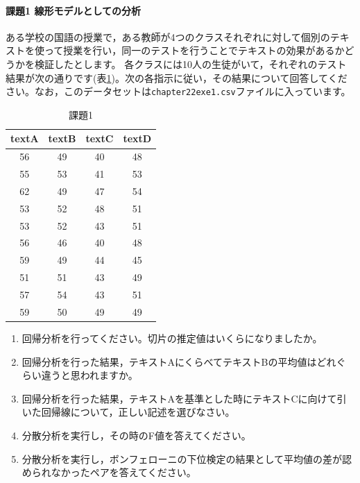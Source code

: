 \documentclass{ltjbook}
\begin{document}
\paragraph{課題1 線形モデルとしての分析}
ある学校の国語の授業で，ある教師が4つのクラスそれぞれに対して個別のテキストを使って授業を行い，同一のテストを行うことでテキストの効果があるかどうかを検証したとします。
各クラスには10人の生徒がいて，それぞれのテスト結果が次の通りです(表\ref{L23::exe1})。次の各指示に従い，その結果について回答してください。なお，このデータセットは\texttt{chapter22exe1.csv}ファイルに入っています。
\begin{table}[ht]
	\centering

	\caption{課題1}
	\begin{tabular}{cccc}
		\hline
		textA & textB & textC & textD \\
		\hline
		56    & 49    & 40    & 48    \\
		55    & 53    & 41    & 53    \\
		62    & 49    & 47    & 54    \\
		53    & 52    & 48    & 51    \\
		53    & 52    & 43    & 51    \\
		56    & 46    & 40    & 48    \\
		59    & 49    & 44    & 45    \\
		51    & 51    & 43    & 49    \\
		57    & 54    & 43    & 51    \\
		59    & 50    & 49    & 49    \\
		\hline
	\end{tabular}
	\label{L23::exe1}
\end{table}

\begin{enumerate}
	\item 回帰分析を行ってください。切片の推定値はいくらになりましたか。
	\item 回帰分析を行った結果，テキストAにくらべてテキストBの平均値はどれぐらい違うと思われますか。
	\item 回帰分析を行った結果，テキストAを基準とした時にテキストCに向けて引いた回帰線について，正しい記述を選びなさい。
	\item 分散分析を実行し，その時のF値を答えてください。
	\item 分散分析を実行し，ボンフェローニの下位検定の結果として平均値の差が認められなかったペアを答えてください。
\end{enumerate}
\end{document}
